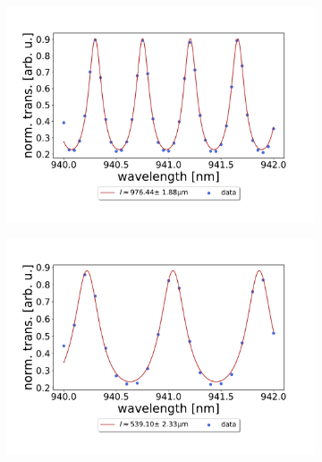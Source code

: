 \begin{figure}[h!]
    \centering
    \begin{subfigure}[b]{0.49\textwidth}
        \includegraphics[width=\textwidth]{figures/results/double fano fits/1000um_M3:M5_FSR_scan.pdf}
        \caption{}
        \label{fig:1000um_M3:M5_FSR_scan}
    \end{subfigure}
    \begin{subfigure}[b]{0.49\textwidth}
        \includegraphics[width=\textwidth]{figures/results/double fano fits/550um_M3:M5_FSR_scan.pdf}
        \caption{}
        \label{fig:550um_M3:M5_FSR_scan}
    \end{subfigure}
    \begin{subfigure}[b]{0.49\textwidth}

\end{subfigure}
\end{figure}
